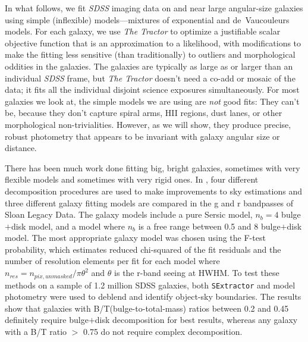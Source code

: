 \documentclass[12pt,preprint,pdftex]{aastex}
\newcommand{\project}[1]{\textsl{#1}}
\begin{document}
In what follows, we fit \project{SDSS} imaging
data on and near large angular-size galaxies using simple (inflexible)
models---mixtures of exponential and de~Vaucouleurs models.  For each
galaxy, we use \project{The Tractor} to
optimize a justifiable scalar objective function that is an
approximation to a likelihood, with modifications to make the fitting
less sensitive (than traditionally) to outliers and morphological
oddities in the galaxies.  The galaxies are typically as large as or
larger than an individual \project{SDSS} frame, but \project{The
  Tractor} doesn't need a co-add or mosaic of the data; it fits all
the individual disjoint science exposures simultaneously.  For most
galaxies we look at, the simple models we are using are \emph{not}
good fits: They can't be, because they don't capture spiral arms, HII
regions, dust lanes, or other morphological non-trivialities.
However, as we will show, they produce precise, robust photometry that
appears to be invariant with galaxy angular size or distance.

There has been much work done fitting big, bright galaxies, sometimes
with very flexible models and sometimes with very rigid ones. In
\cite{simard11}, four different decomposition procedures are used to
make improvements to sky estimations and three different galaxy
fitting models are compared in the g and r bandpasses of Sloan Legacy
Data. The galaxy models include a pure Sersic model, $n_b=4$
bulge$+$disk model, and a model where $n_b$ is a free range between
0.5 and 8 bulge$+$disk model. The most appropriate galaxy model was
chosen using the F-test probability, which estimates reduced chi-squared of
the fit residuals and the number of resolution elements per fit for
each model where $n_{res}=n_{pix,unmasked}/ \pi\theta^2$ and $\theta$
is the r-band seeing at HWHM. To test these methods on a sample of
1.2 million SDSS galaxies, both \verb|SExtractor| and model photometry were used
to deblend and identify object-sky boundaries. The results show that
galaxies with B/T(bulge-to-total-mass) ratios between 0.2 and 0.45
definitely require bulge$+$disk decomposition for best results,
whereas any galaxy with a B/T ratio $>$ 0.75 do not require complex
decomposition.
\end{document}
